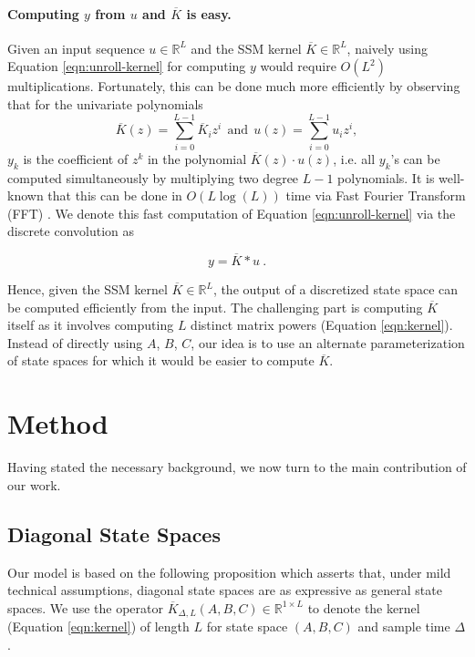 \paragraph{Computing $y$ from $u$ and $\overline{K}$ is easy.} Given an input sequence $u \in \mathbb{R}^L$ and the SSM kernel $\overline{K} \in \mathbb{R}^L$, naively using Equation \ref{eqn:unroll-kernel} for computing $y$ would require $O(L^2)$ multiplications. Fortunately, this can be done much more efficiently by observing that for the univariate polynomials 
$$\overline{K}(z) = \sum_{i=0}^{L-1} \overline{K}_i z^i \ \ \text{and}\ \ u(z) = \sum_{i=0}^{L-1} u_i z^i ,$$ $y_k$ is the coefficient of $z^k$ in the polynomial $\overline{K}(z) \cdot u(z)$, i.e. all $y_k$'s can be computed simultaneously by multiplying two degree $L-1$ polynomials. It is well-known that this can be done in $O(L\log(L))$ time via Fast Fourier Transform (FFT) \cite{cormen}. We denote this fast computation of Equation \ref{eqn:unroll-kernel} via the discrete convolution as

\begin{equation}\label{eqn:convolution}
y = \overline{K} * u \ .
\end{equation}

Hence, given the SSM kernel $\overline{K} \in \mathbb{R}^L$, the output of a discretized state space can be computed efficiently from the input. The challenging part is computing $\overline{K}$ itself as it involves computing $L$ distinct matrix powers (Equation \ref{eqn:kernel}). Instead of directly using $A$, $B$, $C$, our idea is to use an alternate parameterization of state spaces for which it would be easier to compute $\overline{K}$.

\section{Method}\label{sec:model}

Having stated the necessary background, we now turn to the main contribution of our work. 

\subsection{Diagonal State Spaces}\label{sec:dss}

Our model is based on the following proposition which asserts that, under mild technical assumptions, diagonal state spaces are as expressive as general state spaces. We use the operator $\overline{K}_{\Delta, L}(A, B, C) \in \mathbb{R}^{1\times L}$ to denote the kernel (Equation \ref{eqn:kernel}) of length $L$ for state space $(A, B, C)$ and sample time $\Delta$.

